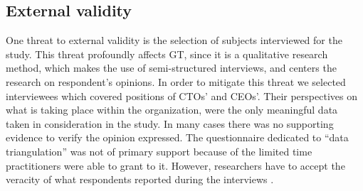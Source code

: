 \documentclass[10pt,journal,letterpaper,compsoc]{IEEEtran}
\begin{document}

\subsection{External validity}

One threat to external validity is the selection of subjects interviewed  for
the study. This threat profoundly affects GT, since it is a qualitative
research method, which makes the use of semi-structured interviews, and centers
the research on respondent's opinions.  In order to mitigate this threat we
selected interviewees which  covered positions of CTOs' and CEOs'. Their
perspectives on what is taking  place within the organization, were the only
meaningful data taken in  consideration in the study.  In many cases there was
no supporting evidence to  verify the opinion expressed. The questionnaire
dedicated to ``data  triangulation'' was not of primary support because of the
limited time  practitioners were able to grant to it. However, researchers have
to accept the  veracity of what respondents reported during the interviews
\cite{Coleman2008a}.  %
\end{document}
